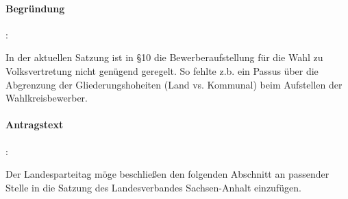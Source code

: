 \paragraph{Begründung}:

In der aktuellen Satzung ist in §10 die Bewerberaufstellung für die Wahl zu Volksvertretung nicht genügend geregelt. So fehlte z.b. ein Passus über die Abgrenzung der Gliederungshoheiten (Land vs. Kommunal) beim Aufstellen der Wahlkreisbewerber.



\paragraph{Antragstext}:

Der Landesparteitag möge beschließen den folgenden Abschnitt an passender Stelle in die Satzung des Landesverbandes Sachsen-Anhalt einzufügen.

